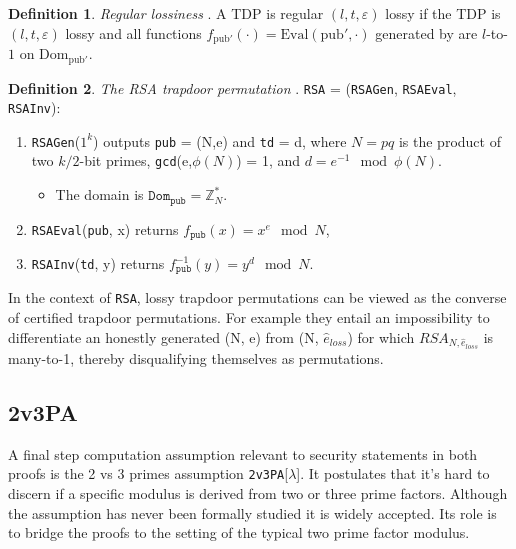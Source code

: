\documentclass[]{final_report}
\theoremstyle{definition}
\newtheorem{definition}{Definition}[chapter]
\begin{document}
\begin{definition}
\label{def:reg-los}
\textit{Regular lossiness} \cite{10.1145/1374376.1374406, kakvi2018optimal}. A TDP is regular \( (l, t, \varepsilon) \) lossy if the TDP is \( (l, t, \varepsilon) \) lossy and all functions \( f_{\text{pub}'}(\cdot) = \text{Eval}(\text{pub}', \cdot) \) generated by  are \( l \)-to-\( 1 \) on \( \text{Dom}_{\text{pub}'} \).
\end{definition}

\begin{definition} 
\textit{The RSA trapdoor permutation} \cite{kakvi2018optimal}. \texttt{RSA} = (\texttt{RSAGen}, \texttt{RSAEval}, \texttt{RSAInv}): 
\begin{enumerate}
\item \texttt{RSAGen}($1^k$) outputs \texttt{pub} = (N,e) and \texttt{td} = d, where $N = pq$ is the product of two $k/2$-bit primes, \texttt{gcd}(e,$\phi(N)$) = 1, and $d = e^{-1} \mod \phi(N)$. 
\begin{itemize}
\item The domain is $\texttt{Dom}_{\texttt{pub}} = \mathbb{Z}_N^*$. 
\end{itemize}
\item \texttt{RSAEval}(\texttt{pub}, x) returns $f_{\texttt{pub}}(x) = x^e \mod N$, 
\item \texttt{RSAInv}(\texttt{td}, y) returns $f_{\texttt{pub}}^{-1}(y) = y^d \mod N$. 
\end{enumerate}

\end{definition} 

In the context of \texttt{RSA}, lossy trapdoor permutations can be viewed as the converse of certified trapdoor permutations. For example they entail an impossibility to differentiate an honestly generated (N, e) from (N, $\hat{e}_{loss}$) for which $RSA_{N, \hat{e}_{loss}}$ is many-to-1, thereby disqualifying themselves as permutations.


\subsection{2v3PA}
A final step computation assumption relevant to security statements in both proofs is the 2 vs 3 primes assumption \texttt{2v3PA}[$\lambda$]. It postulates that it's hard to discern if a specific modulus is derived from two or three prime factors. Although the assumption has never been formally studied it is widely accepted. Its role is to bridge the proofs to the setting of the typical two prime factor modulus.
\end{document}
